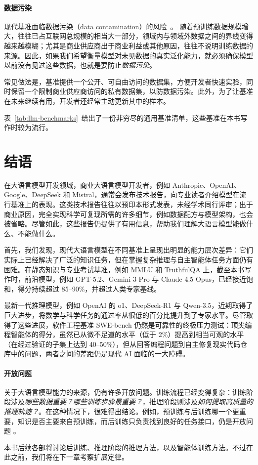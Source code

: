 \paragraph{数据污染}
现代基准面临数据污染（data contamination）的风险~\citep{balloccu-etal-2024-leak}。
随着预训练数据规模增大，往往已占互联网总规模的相当大一部分，领域内与领域外数据之间的界线变得越来越模糊；尤其是商业供应商出于商业利益或其他原因，往往不说明训练数据的来源。因此，如果我们希望衡量模型对未见数据的真实泛化能力，就必须确保模型以前没有见过这些数据，也就是要防止{\em 数据污染}。

常见做法是，基准提供一个公开、可自由访问的数据集，方便开发者快速实验，同时保留一个限制商业供应商访问的私有数据集，以防数据污染。此外，为了让基准在未来继续有用，开发者还经常主动更新其中的样本。

表~\ref{tab:llm-benchmarks}~给出了一份非穷尽的通用基准清单，这些基准在本书写作时较为流行。

\section{结语}

在大语言模型开发领域，商业大语言模型开发者，例如 Anthropic、OpenAI、Google、DeepSeek 和 Mistral，通常会发布技术报告，向专业读者介绍模型在流行基准上的表现。这类技术报告往往以预印本形式发表，未经学术同行评审；出于商业原因，完全实现科学可复现所需的许多细节，例如数据配方与模型架构，也会被省略。尽管如此，这些报告仍提供了有用信息，帮助我们理解大语言模型能做什么、不能做什么。

首先，我们发现，现代大语言模型在不同基准上呈现出明显的能力层次差异：它们实际上已经解决了广泛的知识任务，但在掌握复杂推理与自主智能体任务方面仍有困难。在静态知识与专业考试基准，例如 MMLU 和 TruthfulQA 上，截至本书写作时，前沿模型，例如 GPT-5.2、Gemini 3 Pro 与 Claude 4.5 Opus，已经接近饱和，得分持续超过 85--90\%，并超过人类专家基线。

最新一代推理模型，例如 OpenAI 的 o1、DeepSeek-R1 与 Qwen-3.5，近期取得了巨大进步，将数学与科学任务的通过率从很低的百分比提升到了专家水平。尽管取得了这些进展，软件工程基准 SWE-bench 仍然是可靠性的终极压力测试：顶尖编程智能体的得分，虽然已从微不足道的水平（低于 2\%）提高到相当可观的水平（在经过验证的子集上达到 40--50\%），但从回答编程问题到自主修复现实代码仓库中的问题，两者之间的差距仍是现代 AI 面临的一大障碍。

\paragraph{开放问题}
关于大语言模型能力的来源，仍有许多开放问题。训练流程已经变得复杂：训练阶段涉及{\em 哪些数据重要？哪些训练步骤最重要？}，推理阶段则涉及{\em 如何提取高质量的推理轨迹？}。在这种情况下，很难得出结论。例如，预训练与后训练哪一个更重要，知识是否主要来自预训练，而后训练只负责找到良好的任务接口，仍是开放问题 \citep{zhou2023lima}。

本书后续各部将讨论后训练、推理阶段的推理方法，以及智能体训练方法。不过在此之前，我们将在下一章考察扩展定律。



